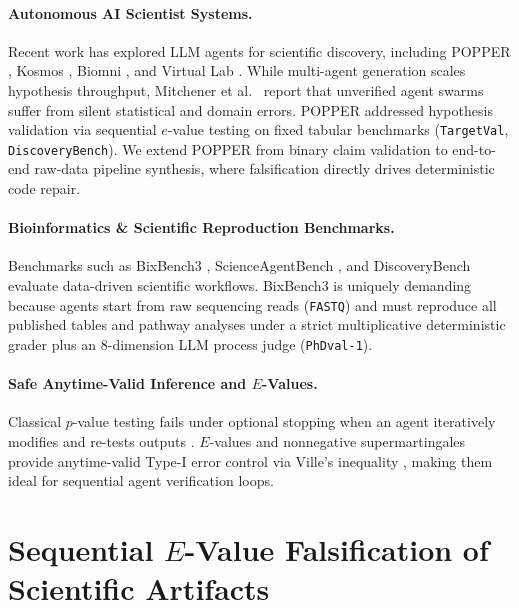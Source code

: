 \documentclass[10pt,twocolumn]{article}
\begin{document}
\paragraph{Autonomous AI Scientist Systems.}
Recent work has explored LLM agents for scientific discovery, including POPPER \cite{huang2025popper}, Kosmos \cite{mitchener2025kosmos}, Biomni \cite{huang2025biomni}, and Virtual Lab \cite{swanson2024virtuallab}. While multi-agent generation scales hypothesis throughput, Mitchener et al.\ \cite{mitchener2025kosmos} report that unverified agent swarms suffer from silent statistical and domain errors. POPPER \cite{huang2025popper} addressed hypothesis validation via sequential $e$-value testing on fixed tabular benchmarks (\texttt{TargetVal}, \texttt{DiscoveryBench}). We extend POPPER from binary claim validation to end-to-end raw-data pipeline synthesis, where falsification directly drives deterministic code repair.

\paragraph{Bioinformatics & Scientific Reproduction Benchmarks.}
Benchmarks such as BixBench3 \cite{edison2026bixbench3}, ScienceAgentBench \cite{chen2024scienceagentbench}, and DiscoveryBench \cite{majumder2024discoverybench} evaluate data-driven scientific workflows. BixBench3 is uniquely demanding because agents start from raw sequencing reads (\texttt{FASTQ}) and must reproduce all published tables and pathway analyses under a strict multiplicative deterministic grader plus an 8-dimension LLM process judge (\texttt{PhDval-1}).

\paragraph{Safe Anytime-Valid Inference and $E$-Values.}
Classical $p$-value testing fails under optional stopping when an agent iteratively modifies and re-tests outputs \cite{ramdas2023game}. $E$-values \cite{vovk2021values,shafer2021testing} and nonnegative supermartingales provide anytime-valid Type-I error control via Ville's inequality \cite{ville1939etude}, making them ideal for sequential agent verification loops.

\section{Sequential $E$-Value Falsification of Scientific Artifacts}
\label{sec:method}
\end{document}
